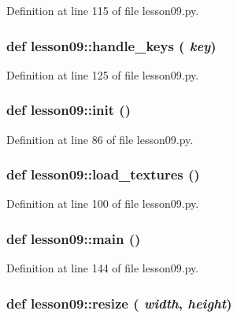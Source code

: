 Definition at line 115 of file lesson09.py.
\subsubsection{\setlength{\rightskip}{0pt plus 5cm}def lesson09::handle\_\-keys ( {\em key})}\label{namespacelesson09_4d0bee7080cb1e0802f7240011d2fb4c}




Definition at line 125 of file lesson09.py.
\subsubsection{\setlength{\rightskip}{0pt plus 5cm}def lesson09::init ()}\label{namespacelesson09_f1fcc9954a8441178ab32ea2f7258d2e}




Definition at line 86 of file lesson09.py.
\subsubsection{\setlength{\rightskip}{0pt plus 5cm}def lesson09::load\_\-textures ()}\label{namespacelesson09_2b1709caeb26ac6d7de462d1b34e6138}




Definition at line 100 of file lesson09.py.
\subsubsection{\setlength{\rightskip}{0pt plus 5cm}def lesson09::main ()}\label{namespacelesson09_7220b96f3991e741c4f0ef23c08d3a90}




Definition at line 144 of file lesson09.py.
\subsubsection{\setlength{\rightskip}{0pt plus 5cm}def lesson09::resize ( {\em width},  {\em height})}\label{namespacelesson09_b6c1ecb5834e034942a28b89de56fa28}




